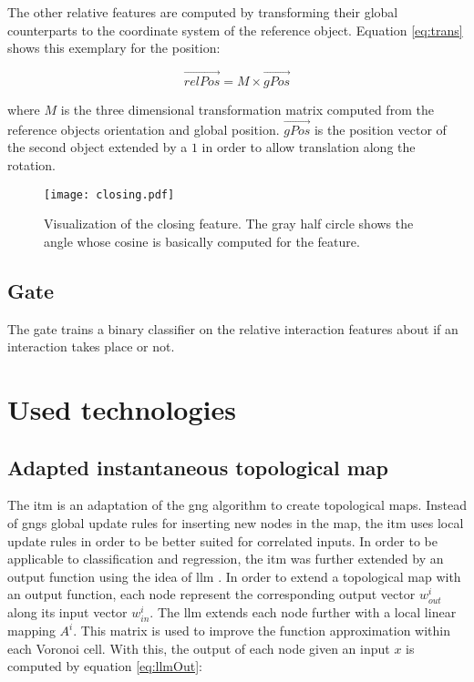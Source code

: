 The other relative features are computed by transforming their global counterparts to the coordinate system of the reference object. Equation \ref{eq:trans} shows this exemplary for the position:

\begin{equation}
	\vec{relPos} = M \times \vec{gPos}
\label{eq:trans}
\end{equation}

where $M$ is the three dimensional transformation matrix computed from the reference objects orientation and global position. $\vec{gPos}$ is the position vector of the second object extended by a $1$ in order to allow translation along the rotation. 

\begin{figure}
	\centering
	\texttt{[image: closing.pdf]}
	\caption{Visualization of the closing feature. The gray half circle shows the angle whose cosine is basically computed for the feature.} 
	\label{fig:closing}
\end{figure}

\subsection{Gate}

The gate trains a binary classifier on the relative interaction features about if an interaction takes place or not. 



\section{Used technologies \label{sec:technologies}}

\subsection{Adapted instantaneous topological map \label{sec:ITM}}

The \gls{itm} \cite{itm} is an adaptation of the \gls{gng} \cite{gng} algorithm to create topological maps. Instead of \glspl{gng} global update rules for inserting new nodes in the map, the \gls{itm} uses local update rules in order to be better suited for correlated inputs. 
In order to be applicable to classification and regression, the \gls{itm} was further extended by an output function using the idea of \gls{llm} \cite{LLM}. In order to extend a topological map with an output function, each node represent the corresponding output vector $w^i_{out}$ along its input vector $w^i_{in}$. The \gls{llm} extends each node further with a local linear mapping $A^i$. This matrix is used to improve the function approximation within each Voronoi cell. With this, the output of each node given an input $x$ is computed by equation \ref{eq:llmOut}:

